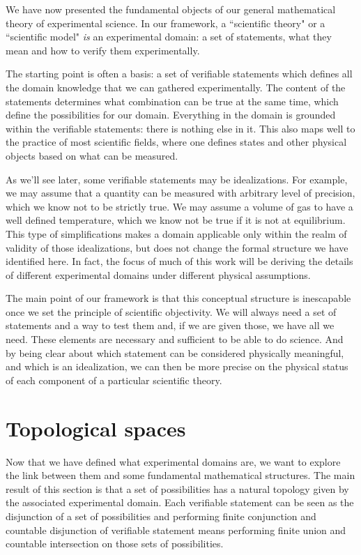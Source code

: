 \documentclass[11pt,letterpaper,fleqn]{memoir} %
\begin{document}
We have now presented the fundamental objects of our general mathematical theory of experimental science. In our framework, a ``scientific theory" or a ``scientific model" \emph{is} an experimental domain: a set of statements, what they mean and how to verify them experimentally.

The starting point is often a basis: a set of verifiable statements which defines all the domain knowledge that we can gathered experimentally. The content of the statements determines what combination can be true at the same time, which define the possibilities for our domain. Everything in the domain is grounded within the verifiable statements: there is nothing else in it. This also maps well to the practice of most scientific fields, where one defines states and other physical objects based on what can be measured.

As we'll see later, some verifiable statements may be idealizations. For example, we may assume that a quantity can be measured with arbitrary level of precision, which we know not to be strictly true. We may assume a volume of gas to have a well defined temperature, which we know not be true if it is not at equilibrium. This type of simplifications makes a domain applicable only within the realm of validity of those idealizations, but does not change the formal structure we have identified here. In fact, the focus of much of this work will be deriving the details of different experimental domains under different physical assumptions.

The main point of our framework is that this conceptual structure is inescapable once we set the principle of scientific objectivity. We will always need a set of statements and a way to test them and, if we are given those, we have all we need. These elements are necessary and sufficient to be able to do science. And by being clear about which statement can be considered physically meaningful, and which is an idealization, we can then be more precise on the physical status of each component of a particular scientific theory.

\section{Topological spaces}

Now that we have defined what experimental domains are, we want to explore the link between them and some fundamental mathematical structures. The main result of this section is that a set of possibilities has a natural topology given by the associated experimental domain. Each verifiable statement can be seen as the disjunction of a set of possibilities  and performing finite conjunction and countable disjunction of verifiable statement means performing finite union and countable intersection on those sets of possibilities.
\end{document}

